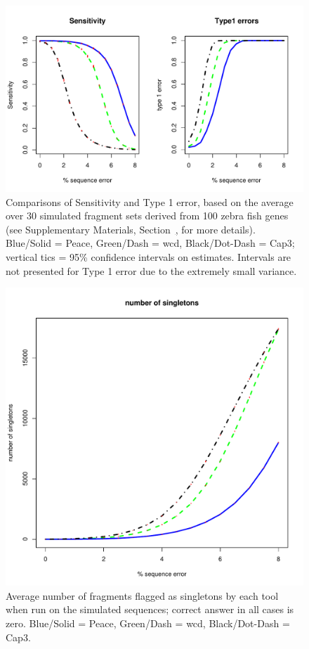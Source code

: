 \documentclass[a4,center,fleqn]{NAR}
\begin{document}
\begin{figure}[b]
\centerline{
\includegraphics[scale=0.5]{pics.d/SeT1.pdf} 
}
\label{SeT1}
\caption{Comparisons of Sensitivity and Type 1 error, based on the
  average over 30 simulated fragment sets derived from 100 zebra fish genes
  (see Supplementary Materials, Section~\href{sim_results}, for more
  details).   Blue/Solid = {\sc Peace}, Green/Dash =
  {\sc wcd}, Black/Dot-Dash = {\sc Cap3}; vertical tics = 95\% confidence
  intervals on estimates.  Intervals are not presented for Type 1
  error due to the extremely small variance.}
\end{figure}

\begin{figure}[b]
\centerline{
\includegraphics[scale=0.35]{pics.d/singletons.pdf}
}
\label{singletons}
\caption{Average number of fragments flagged as singletons by each tool
  when run on the simulated sequences; correct answer in all cases is
  zero.  Blue/Solid = {\sc Peace}, Green/Dash = {\sc wcd},
  Black/Dot-Dash = {\sc Cap3}.}
\end{figure}
\end{document}
